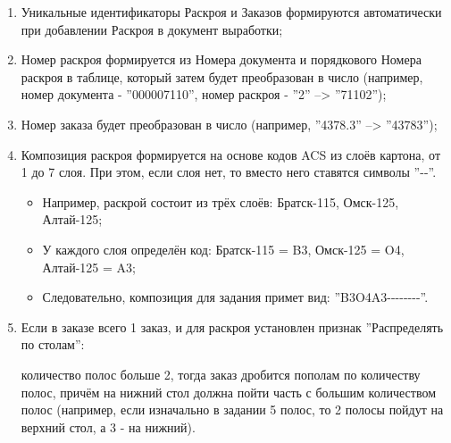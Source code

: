 \begin{enumerate}

    \item Уникальные идентификаторы Раскроя и Заказов формируются автоматически при добавлении Раскроя в документ выработки;
    \item Номер раскроя формируется из Номера документа и порядкового Номера раскроя в таблице, который затем будет преобразован в число (например, номер документа - ''000007110'', номер раскроя - ''2'' --> ''71102'');
    \item Номер заказа будет преобразован в число (например, ''4378.3'' --> ''43783'');

    \item Композиция раскроя формируется на основе кодов ACS из слоёв картона, от 1 до 7 слоя. При этом, если слоя нет, то вместо него ставятся символы ''-{}-''. 
    \begin{itemize}
      \item 	Например, раскрой состоит из трёх слоёв: Братск-115, Омск-125, Алтай-125;
       \item 	У каждого слоя определён код: Братск-115 = B3, Омск-125 = O4, Алтай-125 = A3;
       \item 	Следовательно, композиция для задания примет вид: ''B3O4A3-{}-{}-{}-{}-{}-{}-{}-''.
    \end{itemize}
    
    \item Если в заказе всего 1 заказ, и для раскроя установлен признак ''Распределять по столам'':
    \begin{itemize}
	 количество полос больше 2, тогда заказ дробится пополам по количеству полос, причём на нижний стол должна пойти часть с большим количеством полос (например, если изначально в задании 5 полос, то 2 полосы пойдут на верхний стол, а 3 - на нижний).


\end{itemize}
\end{enumerate}
